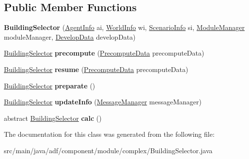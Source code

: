 \subsection*{Public Member Functions}
\begin{DoxyCompactItemize}
\item 
\hypertarget{classadf_1_1component_1_1module_1_1complex_1_1BuildingSelector_accb98a3dc072b53332144c0570eea713}{}\label{classadf_1_1component_1_1module_1_1complex_1_1BuildingSelector_accb98a3dc072b53332144c0570eea713} 
{\bfseries Building\+Selector} (\hyperlink{classadf_1_1agent_1_1info_1_1AgentInfo}{Agent\+Info} ai, \hyperlink{classadf_1_1agent_1_1info_1_1WorldInfo}{World\+Info} wi, \hyperlink{classadf_1_1agent_1_1info_1_1ScenarioInfo}{Scenario\+Info} si, \hyperlink{classadf_1_1agent_1_1module_1_1ModuleManager}{Module\+Manager} module\+Manager, \hyperlink{classadf_1_1agent_1_1develop_1_1DevelopData}{Develop\+Data} develop\+Data)
\item 
\hypertarget{classadf_1_1component_1_1module_1_1complex_1_1BuildingSelector_afe2f19fe29b3a57e3df4a003923d9cdf}{}\label{classadf_1_1component_1_1module_1_1complex_1_1BuildingSelector_afe2f19fe29b3a57e3df4a003923d9cdf} 
\hyperlink{classadf_1_1component_1_1module_1_1complex_1_1BuildingSelector}{Building\+Selector} {\bfseries precompute} (\hyperlink{classadf_1_1agent_1_1precompute_1_1PrecomputeData}{Precompute\+Data} precompute\+Data)
\item 
\hypertarget{classadf_1_1component_1_1module_1_1complex_1_1BuildingSelector_ab23c92d96da847e1a9218a7fb50e6098}{}\label{classadf_1_1component_1_1module_1_1complex_1_1BuildingSelector_ab23c92d96da847e1a9218a7fb50e6098} 
\hyperlink{classadf_1_1component_1_1module_1_1complex_1_1BuildingSelector}{Building\+Selector} {\bfseries resume} (\hyperlink{classadf_1_1agent_1_1precompute_1_1PrecomputeData}{Precompute\+Data} precompute\+Data)
\item 
\hypertarget{classadf_1_1component_1_1module_1_1complex_1_1BuildingSelector_a01457e08066eb8bf50fe521df437c03e}{}\label{classadf_1_1component_1_1module_1_1complex_1_1BuildingSelector_a01457e08066eb8bf50fe521df437c03e} 
\hyperlink{classadf_1_1component_1_1module_1_1complex_1_1BuildingSelector}{Building\+Selector} {\bfseries preparate} ()
\item 
\hypertarget{classadf_1_1component_1_1module_1_1complex_1_1BuildingSelector_af80b6a108c9d3741c2e8d11b4fb3cf98}{}\label{classadf_1_1component_1_1module_1_1complex_1_1BuildingSelector_af80b6a108c9d3741c2e8d11b4fb3cf98} 
\hyperlink{classadf_1_1component_1_1module_1_1complex_1_1BuildingSelector}{Building\+Selector} {\bfseries update\+Info} (\hyperlink{classadf_1_1agent_1_1communication_1_1MessageManager}{Message\+Manager} message\+Manager)
\item 
\hypertarget{classadf_1_1component_1_1module_1_1complex_1_1BuildingSelector_a4366ea9047a409d4b96d78aa976b6781}{}\label{classadf_1_1component_1_1module_1_1complex_1_1BuildingSelector_a4366ea9047a409d4b96d78aa976b6781} 
abstract \hyperlink{classadf_1_1component_1_1module_1_1complex_1_1BuildingSelector}{Building\+Selector} {\bfseries calc} ()
\end{DoxyCompactItemize}


The documentation for this class was generated from the following file\+:\begin{DoxyCompactItemize}
\item 
src/main/java/adf/component/module/complex/Building\+Selector.\+java\end{DoxyCompactItemize}
